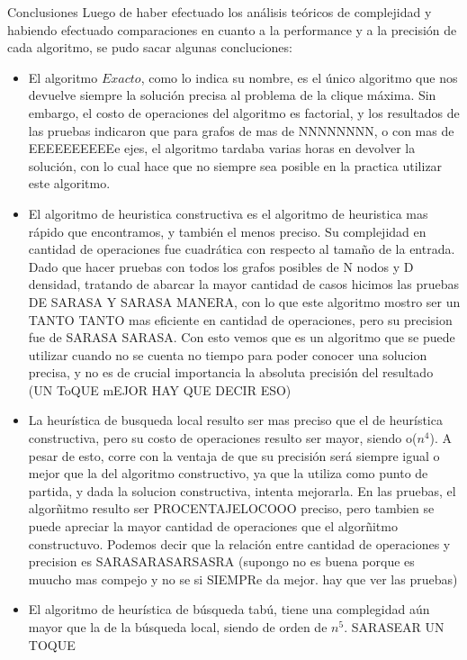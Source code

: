 \documentclass[12pt,titlepage]{article}
\newcommand{\tab}{\hspace*{2em}}
\begin{document}
	\begin{section}{Conclusiones}
	\tab Luego de haber efectuado los análisis teóricos de complejidad y habiendo efectuado comparaciones en cuanto a la performance y a la precisión de cada algoritmo, se pudo sacar algunas concluciones:
	\begin{itemize}
		\item El algoritmo $Exacto$, como lo indica su nombre, es el único algoritmo que nos devuelve siempre la solución precisa al problema de la clique máxima. Sin embargo, el costo de operaciones del algoritmo es factorial, y los resultados de las pruebas indicaron que para grafos de mas de NNNNNNNN, o con mas de EEEEEEEEEEe ejes, el algoritmo tardaba varias horas en devolver la solución, con lo cual hace que no siempre sea posible en la practica utilizar este algoritmo.
		\item El algoritmo de heuristica constructiva es el algoritmo de heuristica mas rápido que encontramos, y también el menos preciso. Su complejidad en cantidad de operaciones fue cuadrática con respecto al tamaño de la entrada. Dado que hacer pruebas con todos los grafos posibles de N nodos y D densidad, tratando de abarcar la mayor cantidad de casos hicimos las pruebas  DE SARASA Y SARASA MANERA, con lo que este algoritmo mostro ser un TANTO TANTO mas eficiente en cantidad de operaciones, pero su precision fue de SARASA SARASA. Con esto vemos que es un algoritmo que se puede utilizar cuando no se cuenta no tiempo para poder conocer una solucion precisa, y no es de crucial importancia la absoluta precisión del resultado (UN ToQUE mEJOR HAY QUE DECIR ESO)
		\item La heurística de busqueda local resulto ser mas preciso que el de heurística constructiva, pero su costo de operaciones resulto ser mayor, siendo o($n^4$). A pesar de esto, corre con la ventaja de que su precisión será siempre igual o mejor que la del algoritmo constructivo, ya que la utiliza como punto de partida, y dada la solucion constructiva, intenta mejorarla. En las pruebas, el algorñitmo resulto ser PROCENTAJELOCOOO preciso, pero tambien se puede apreciar la mayor cantidad de operaciones que el algorñitmo constructuvo. Podemos decir que la relación entre cantidad de operaciones y precision es SARASARASARSASRA (supongo no es buena porque es muucho mas compejo y no se si SIEMPRe da mejor. hay que ver las pruebas)
		\item El algoritmo de heurística de búsqueda tabú, tiene una complegidad aún mayor que la de la búsqueda local, siendo de orden de $n^5$. SARASEAR UN TOQUE



\end{itemize}
\end{section}
\end{document}
